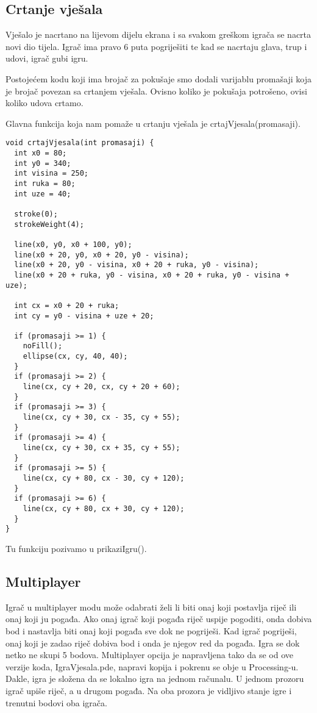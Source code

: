 \documentclass{article}
\begin{document}
\subsection{Crtanje vješala}
Vješalo je nacrtano na lijevom dijelu 
ekrana i sa svakom greškom igrača se 
nacrta novi dio tijela. Igrač ima pravo 6 
puta pogriješiti te kad se nacrtaju glava, 
trup i udovi, igrač gubi igru.

Postojećem kodu koji ima brojač za 
pokušaje smo dodali varijablu promašaji 
koja je brojač povezan sa crtanjem 
vješala. Ovisno koliko je pokušaja 
potrošeno, ovisi koliko udova crtamo.

Glavna funkcija koja nam pomaže u crtanju vješala je crtajVjesala(promasaji).

\begin{verbatim}
void crtajVjesala(int promasaji) {
  int x0 = 80;         
  int y0 = 340;        
  int visina = 250;    
  int ruka = 80;       
  int uze = 40;        

  stroke(0);
  strokeWeight(4);

  line(x0, y0, x0 + 100, y0);         
  line(x0 + 20, y0, x0 + 20, y0 - visina);  
  line(x0 + 20, y0 - visina, x0 + 20 + ruka, y0 - visina); 
  line(x0 + 20 + ruka, y0 - visina, x0 + 20 + ruka, y0 - visina + uze); 

  int cx = x0 + 20 + ruka;          
  int cy = y0 - visina + uze + 20; 

  if (promasaji >= 1) {
    noFill();
    ellipse(cx, cy, 40, 40); 
  }
  if (promasaji >= 2) {
    line(cx, cy + 20, cx, cy + 20 + 60); 
  }
  if (promasaji >= 3) {
    line(cx, cy + 30, cx - 35, cy + 55); 
  }
  if (promasaji >= 4) {
    line(cx, cy + 30, cx + 35, cy + 55); 
  }
  if (promasaji >= 5) {
    line(cx, cy + 80, cx - 30, cy + 120); 
  }
  if (promasaji >= 6) {
    line(cx, cy + 80, cx + 30, cy + 120); 
  }
}
\end{verbatim}
Tu funkciju pozivamo u prikaziIgru().


\subsection{Multiplayer}
Igrač u multiplayer modu može odabrati 
želi li biti onaj koji postavlja riječ ili 
onaj koji ju pogađa. Ako onaj igrač koji 
pogađa riječ uspije pogoditi, onda dobiva 
bod i nastavlja biti onaj koji pogađa sve 
dok ne pogriješi. Kad igrač pogriješi, 
onaj koji je zadao riječ dobiva bod i onda 
je njegov red da pogađa. Igra se dok netko
ne skupi 5 bodova. 
Multiplayer opcija je napravljena tako da se od ove verzije koda, IgraVjesala.pde, napravi 
kopija i pokrenu se obje u Processing-u. Dakle, igra je složena da se lokalno igra na jednom 
računalu. 
U jednom prozoru igrač upiše riječ, a u drugom pogađa. Na oba prozora je vidljivo stanje igre i 
trenutni bodovi oba igrača. 
\end{document}
